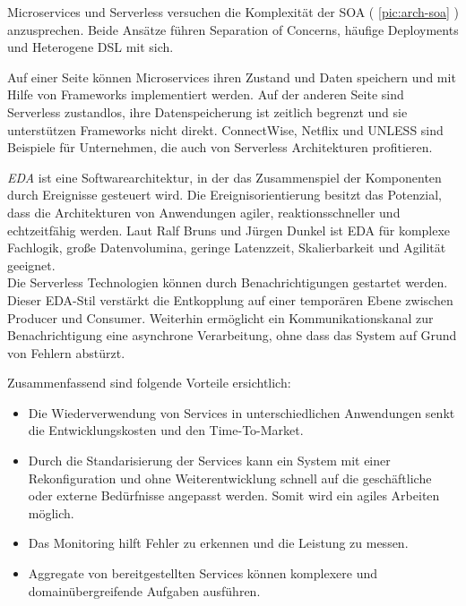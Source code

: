 \documentclass[
12pt,
english,
ngerman,
headsepline,
twoside,
openright,
numbers=noenddot,version=first
]{scrreprt}
\begin{document}
Microservices und Serverless versuchen die Komplexität der SOA ( \autoref{pic:arch-soa} ) anzusprechen. Beide Ansätze führen  Separation of Concerns, häufige Deployments und Heterogene \acrfull{DSL} mit sich.\cite{microAdv}

Auf einer Seite können Microservices ihren Zustand und Daten speichern und mit Hilfe von Frameworks implementiert werden. Auf der anderen Seite sind Serverless zustandlos, ihre Datenspeicherung ist zeitlich begrenzt und sie unterstützen Frameworks nicht direkt. ConnectWise\cite{ConnectWise}, Netflix\cite{Netflix} und UNLESS\cite{UNLESS} sind Beispiele für Unternehmen, die auch von Serverless Architekturen profitieren.


\textit{\acrfull{EDA}} ist eine Softwarearchitektur, in der das Zusammenspiel der Komponenten durch Ereignisse gesteuert wird. Die Ereignisorientierung besitzt das Potenzial, dass die Architekturen von Anwendungen agiler, reaktionsschneller und
echtzeitfähig werden. Laut Ralf Bruns und Jürgen Dunkel ist \acrshort{EDA} für komplexe Fachlogik, große Datenvolumina, geringe Latenzzeit, Skalierbarkeit und Agilität geeignet.\cite{archEDA}\\
Die Serverless Technologien können durch Benachrichtigungen gestartet werden. Dieser \acrshort{EDA}-Stil verstärkt die Entkopplung auf einer temporären Ebene zwischen Producer und Consumer. Weiterhin ermöglicht ein Kommunikationskanal zur Benachrichtigung eine asynchrone Verarbeitung, ohne dass das System auf Grund von Fehlern abstürzt. \cite{patternIntegrationEnterprise}

Zusammenfassend sind folgende Vorteile ersichtlich:
\begin{itemize}
	\item Die Wiederverwendung von Services in unterschiedlichen Anwendungen senkt die Entwicklungskosten und den Time-To-Market.
	\item Durch die Standarisierung der Services kann ein System mit einer Rekonfiguration und ohne Weiterentwicklung schnell  auf die geschäftliche oder externe Bedürfnisse angepasst werden. Somit wird ein agiles Arbeiten möglich.
	\item Das Monitoring hilft Fehler zu erkennen und die Leistung zu messen.
	\item Aggregate von bereitgestellten Services können komplexere und domainübergreifende Aufgaben ausführen.
\end{itemize}\cite{cloudEssentials}
\end{document}
